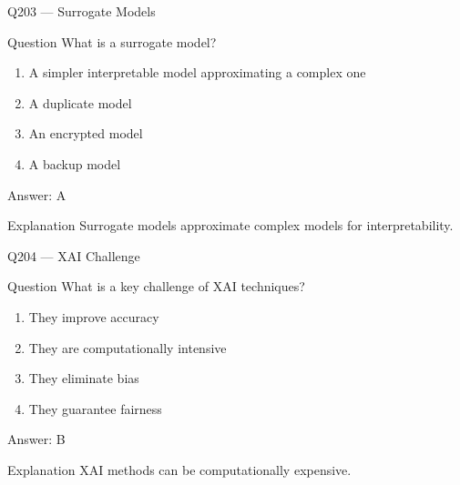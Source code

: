 \documentclass[aspectratio=169,8pt]{beamer}
\begin{document}
								\begin{frame}{Q203 --- Surrogate Models}
									\begin{block}{Question}
										What is a surrogate model?
										\begin{enumerate}
											\item A simpler interpretable model approximating a complex one
											\item A duplicate model
											\item An encrypted model
											\item A backup model
										\end{enumerate}
									\end{block}
									\begin{exampleblock}{Answer: A}\end{exampleblock}
									\begin{block}{Explanation}
										Surrogate models approximate complex models for interpretability.
									\end{block}
								\end{frame}
								
								\begin{frame}{Q204 --- XAI Challenge}
									\begin{block}{Question}
										What is a key challenge of XAI techniques?
										\begin{enumerate}
											\item They improve accuracy
											\item They are computationally intensive
											\item They eliminate bias
											\item They guarantee fairness
										\end{enumerate}
									\end{block}
									\begin{exampleblock}{Answer: B}\end{exampleblock}
									\begin{block}{Explanation}
										XAI methods can be computationally expensive.
									\end{block}
								\end{frame}
								
\end{document}
